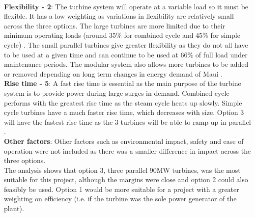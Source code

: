 \documentclass[11pt, oneside]{article}
\begin{document}
\\\textbf{Flexibility - 2}: The turbine system will operate at a variable load so it must be flexible. It has a low weighting as variations in flexibility are relatively small across the three options. The large turbines are more limited due to their minimum operating loads (around 35\% for combined cycle and 45\% for simple cycle) \cite{boyce}. The small parallel turbines give greater flexibility as they do not all have to be used at a given time and can continue to be used at 66\% of full load under maintenance periods. The modular system also allows more turbines to be added or removed depending on long term changes in energy demand of Maui \cite{website:multipleunits}. %
\\\textbf{Rise time - 5}: A fast rise time is essential as the main purpose of the turbine system is to provide power during large surges in demand. Combined cycle performs with the greatest rise time as the steam cycle heats up slowly. Simple cycle turbines have a much faster rise time, which decreases with size. Option 3 will have the fastest rise time as the 3 turbines will be able to ramp up in parallel \cite{website:multipleunits}. 
\\\textbf{Other factors}: Other factors such as environmental impact, safety and ease of operation were not included as there was a smaller difference in impact across the three options.\\
The analysis shows that option 3, three parallel 90MW turbines, was the most suitable for this project, although the margins were close and option 2 could also feasibly be used. Option 1 would be more suitable for a project with a greater weighting on efficiency (i.e. if the turbine was the sole power generator of the plant).
\end{document}
